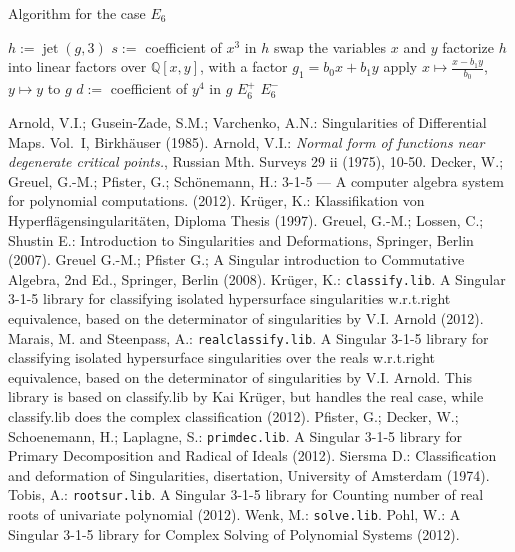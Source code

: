\documentclass[noend]{amsproc}
\DeclareMathOperator{\m}{\mathfrak{m}}
\DeclareMathOperator{\jet}{jet}
\begin{document}
\begin{algorithm}[h]
\caption{\label{alg:E_6}\label{E[6]} Algorithm for the case $E_6$}
\begin{algorithmic}[1]

\REQUIRE{$g\in \m^3\subset\mathbb Q[x,y]$ of complex singularity type $E_6$}
\STATE $h:= \jet(g,3)$
\STATE $s:=$ coefficient of ${x^3}$ in $h$
\STATE swap the variables $x$ and $y$
\ENDIF
\STATE factorize $h$ into linear factors over $\mathbb Q[x,y]$, with a factor
$g_1=b_0x+b_1y$
\STATE apply $x\mapsto \frac{x-b_1y}{b_0}$, $y\mapsto y$ to $g$
\STATE $d :=$ coefficient of $y^4$ in $g$
\RETURN $E_6^+$
\ELSE
\RETURN $E_6^-$
\ENDIF

\end{algorithmic}
\end{algorithm}


 \begin{thebibliography}{99}
 Arnold, V.I.; Gusein-Zade, S.M.; Varchenko, A.N.:
Singularities of Differential Maps. Vol.~I, Birkh\"auser (1985).
 Arnold, V.I.:
\textit{Normal form of functions near degenerate critical points.},
Russian Mth. Surveys 29 ii (1975), 10-50.
Decker, W.; Greuel, G.-M.; Pfister, G.; Sch{\"o}nemann, H.:
 {3-1-5} --- {A} computer algebra system for polynomial
computations.
 (2012).
 Kr\"uger, K.: Klassifikation von
Hyperfl\"agensingularit\"aten, Diploma Thesis (1997).
Greuel, G.-M.; Lossen, C.; Shustin E.:
Introduction to Singularities and Deformations, Springer, Berlin (2007).
 Greuel G.-M.; Pfister G.;
A Singular introduction to Commutative Algebra, 2nd Ed., Springer,
Berlin (2008).
Kr\"uger, K.:
{\tt classify.lib}. {A} {\sc Singular} {3-1-5} library for classifying isolated
hypersurface singularities w.r.t.\@ right equivalence, based on the
determinator of singularities by V.I. Arnold (2012).
Marais, M. and Steenpass, A.:
{\tt realclassify.lib}. {A} {\sc Singular} {3-1-5} library for classifying
isolated hypersurface singularities over the reals w.r.t.\@ right equivalence,
based on the determinator of singularities by V.I. Arnold. This library is
based on classify.lib by Kai Kr\"uger, but handles the real case, while
classify.lib does the complex classification (2012).
 Pfister, G.; Decker, W.;  Schoenemann, H.; Laplagne, S.:
{\tt primdec.lib}. {A} {\sc Singular} {3-1-5} library for Primary Decomposition
and Radical of Ideals (2012).
 Siersma D.: Classification and deformation of Singularities,
disertation, University of Amsterdam (1974).
Tobis, A.:
{\tt rootsur.lib}. {A} {\sc Singular} {3-1-5} library for Counting number of
real roots of univariate polynomial (2012).
 Wenk, M.: {\tt solve.lib}. Pohl, W.:
{A} {\sc Singular} {3-1-5} library for Complex Solving of Polynomial Systems
(2012).

\end{thebibliography}
\end{document}
